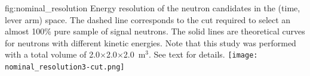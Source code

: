 \begin{dunefigure}{fig:nominal_resolution}
{Energy resolution of the neutron candidates in the (time, lever arm) space. 
The dashed line corresponds to the cut required to select an almost 100\% pure sample of signal neutrons. The solid lines are theoretical curves for neutrons with different kinetic energies.
Note that this study was performed with a total volume of 2.0$\times$2.0$\times$2.0~m$^3$.
See text for details.}
  \texttt{[image: nominal\_resolution3-cut.png]}
\end{dunefigure}





